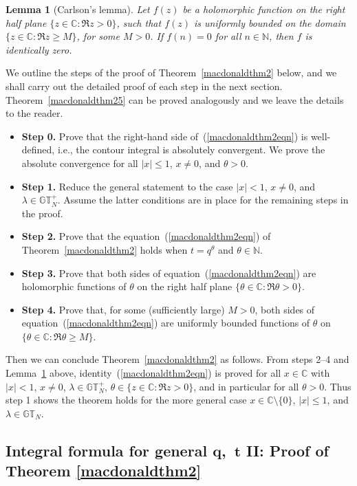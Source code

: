 \documentclass[11pt]{article}
\numberwithin{equation}{section}
\newtheorem{lem}[thm]{Lemma}
\newcommand{\C}{\mathbb{C}}
\newcommand{\N}{\mathbb{N}}
\newcommand{\GT}{\mathbb{GT}}
\newcommand{\GTp}{\mathbb{GT}^+}
\begin{document}
\begin{lem}[Carlson's lemma]\label{carlsonlemma}
Let $f(z)$ be a holomorphic function on the right half plane $\{z\in\C\colon \Re z > 0\}$, such that $f(z)$ is uniformly bounded on the domain $\{z\in\C \colon \Re z \geq M\}$, for some $M>0$. If $f(n) = 0$ for all $n\in\N$, then $f$ is identically zero.
\end{lem}

We outline the steps of the proof of Theorem~\ref{macdonaldthm2} below, and we shall carry out the detailed proof of each step in the next section. Theorem~\ref{macdonaldthm25} can be proved analogously and we leave the details to the reader.
\begin{itemize}\itemsep=0pt
	\item \textbf{Step 0.} Prove that the right-hand side of~(\ref{macdonaldthm2eqn}) is well-def\/ined, i.e., the contour integral is absolutely convergent. We prove the absolute convergence for all $|x|\leq 1$, $x\neq 0$, and $\theta>0$.
	\item \textbf{Step 1.} Reduce the general statement to the case $|x| < 1$, $x\neq 0$, and $\lambda\in\GTp_N$. Assume the latter conditions are in place for the remaining steps in the proof.
	\item \textbf{Step 2.} Prove that the equation~(\ref{macdonaldthm2eqn}) of Theorem~\ref{macdonaldthm2} holds when $t = q^{\theta}$ and $\theta\in\N$.
	\item \textbf{Step 3.} Prove that both sides of equation~(\ref{macdonaldthm2eqn}) are holomorphic functions of $\theta$ on the right half plane $\{\theta\in\C\colon \Re\theta > 0\}$.
	\item \textbf{Step 4.} Prove that, for some (suf\/f\/iciently large) $M > 0$, both sides of equation~(\ref{macdonaldthm2eqn}) are uniformly bounded functions of $\theta$ on $\{\theta\in\C\colon \Re\theta \geq M\}$.
\end{itemize}

Then we can conclude Theorem~\ref{macdonaldthm2} as follows. From steps 2--4 and Lemma~\ref{carlsonlemma} above, identity~(\ref{macdonaldthm2eqn}) is proved for all $x\in\C$ with $|x| < 1$, $x\neq 0$, $\lambda\in\GTp_N$, $\theta\in\{z\in\C \colon \Re z > 0\}$, and in particular for all $\theta > 0$. Thus step 1 shows the theorem holds for the more general case $x\in\C \setminus \{0\}$, $|x|\leq 1$, and $\lambda\in\GT_N$.


\subsection[Integral formula for general $q$,~$t$ II: Proof of Theorem \ref{macdonaldthm2}]{Integral formula for general $\boldsymbol{q}$,~$\boldsymbol{t}$ II: Proof of Theorem \ref{macdonaldthm2}}
\end{document}
